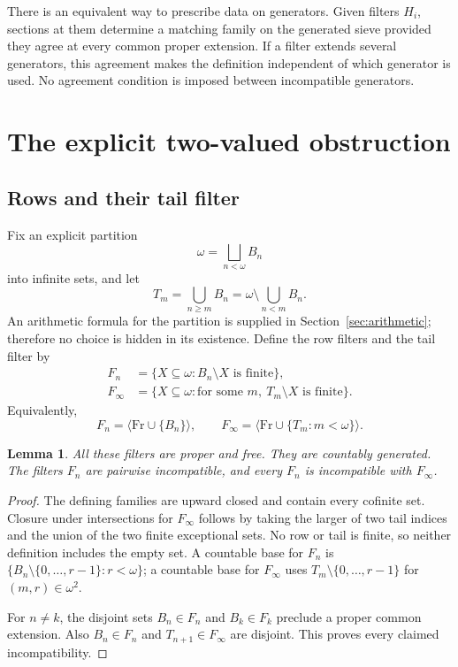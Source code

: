 \documentclass[11pt,letterpaper]{article}
\newtheorem{lemma}[theorem]{Lemma}
\theoremstyle{definition}
\theoremstyle{remark}
\newcommand{\om}{\omega}
\newcommand{\Fr}{\mathrm{Fr}}
\newcommand{\gen}[1]{\langle #1\rangle}
\begin{document}
There is an equivalent way to prescribe data on generators. Given filters
$H_i$, sections at them determine a matching family on the generated sieve
provided they agree at every common proper extension. If a filter extends
several generators, this agreement makes the definition independent of
which generator is used. No agreement condition is imposed between
incompatible generators.

\section{The explicit two-valued obstruction}
\label{sec:obstruction}

\subsection{Rows and their tail filter}
Fix an explicit partition
\begin{equation}\label{eq:partition}
 \om=\bigsqcup_{n<\om}B_n
\end{equation}
into infinite sets, and let
\begin{equation}\label{eq:tail}
 T_m=\bigcup_{n\geq m}B_n
     =\om\setminus\bigcup_{n<m}B_n.
\end{equation}
An arithmetic formula for the partition is supplied in
Section~\ref{sec:arithmetic}; therefore no choice is hidden in its existence.
Define the row filters and the tail filter by
\begin{align}
 F_n&=\{X\subseteq\om:B_n\setminus X\text{ is finite}\},\label{eq:rowfilter}\\
 F_\infty&=\{X\subseteq\om:\text{for some }m,
                         \ T_m\setminus X\text{ is finite}\}.\label{eq:tailfilter}
\end{align}
Equivalently,
\[
 F_n=\gen{\Fr\cup\{B_n\}},\qquad
 F_\infty=\gen{\Fr\cup\{T_m:m<\om\}}.
\]

\begin{lemma}\label{lem:incompatible}
All these filters are proper and free. They are countably generated.
The filters $F_n$ are pairwise incompatible, and every $F_n$ is
incompatible with $F_\infty$.
\end{lemma}
\begin{proof}
The defining families are upward closed and contain every cofinite set.
Closure under intersections for $F_\infty$ follows by taking the larger
of two tail indices and the union of the two finite exceptional sets.
No row or tail is finite, so neither definition includes the empty set.
A countable base for $F_n$ is
$\{B_n\setminus\{0,\ldots,r-1\}:r<\om\}$; a countable base for
$F_\infty$ uses $T_m\setminus\{0,\ldots,r-1\}$ for $(m,r)\in\om^2$.

For $n\neq k$, the disjoint sets $B_n\in F_n$ and $B_k\in F_k$
preclude a proper common extension. Also $B_n\in F_n$ and
$T_{n+1}\in F_\infty$ are disjoint. This proves every claimed
incompatibility.
\end{proof}
\end{document}
